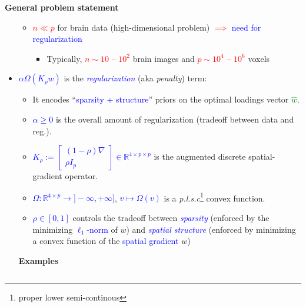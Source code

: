\documentclass[french]{STIC_poster}
\begin{document}
\begin{frame}[t]
\begin{columns}[t]
\begin{column}{.48\linewidth}
\begin{sxbox}[\textwidth]{\textbf{General problem statement}}
\begin{itemize}
\begin{itemize}
                                        \item \textcolor{red}{$n \ll p$} for brain data (high-dimensional problem) \textcolor{red}{$\implies$} \textcolor{blue}{need for regularization}
                                          \begin{itemize}
                                          \item Typically, \textcolor{red}{$n \sim 10$ -- $10^2$} brain images and \textcolor{red}{$p \sim 10^4$ -- $10^6$} voxels
                                          \end{itemize}
                                      \end{itemize}
                                    \item \textcolor{blue}{$\alpha \Omega(K_{\rho}w)$} is the \textcolor{blue}{\textit{regularization}} (aka \textit{penalty}) term:
                                    \begin{itemize}
                                      \item It encodes ``\textcolor{blue}{sparsity + structure}'' priors on the optimal loadings vector \textcolor{green}{$\hat{w}$}.
                                      \item \textcolor{blue}{$\alpha \ge 0$} is the overall amount of regularization (tradeoff between data and reg.).
                                      \item \textcolor{blue}{$K_{\rho} := \begin{bmatrix}(1-\rho)\nabla \\ \rho I_p\end{bmatrix} \in \mathbb{R}^{4 \times p \times p}$} is the augmented discrete spatial-gradient operator.
                                      \item \textcolor{blue}{$\Omega: \mathbb{R}^{4 \times p} \rightarrow ]-\infty,+\infty]$}, \textcolor{blue}{$v \mapsto \Omega(v)$} is a \textit{p.l.s.c}\footnote{proper lower semi-continous} convex function.
                                        \item \textcolor{blue}{$\rho \in [0, 1]$} controls the tradeoff between \textcolor{blue}{\textit{sparsity}} (enforced by the minimizing \textcolor{blue}{$\ell_1$-norm} of $w$) and
                                          \textcolor{blue}{\textit{spatial structure}} (enforced by minimizing a convex function of the \textcolor{blue}{spatial gradient} $w$)
                                    \end{itemize}
                                  \begin{abox}{\textbf{Examples}}

\end{abox}
\end{itemize}
\end{sxbox}
\end{column}
\end{columns}
\end{frame}
\end{document}
